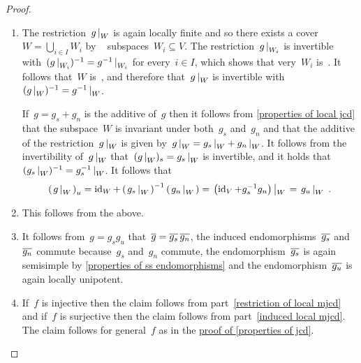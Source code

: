 \begin{proof}
  \leavevmode
  \begin{enumerate}[start=2]
    \item
      The restriction~$\restrict{g}{W}$ is again locally finite and so there exists a cover~$W = \bigcup_{i \in I} W_i$ by ~ subspaces~$W_i \subseteq V$.
      The restriction~$\restrict{g}{W_i}$ is invertible with~$(\restrict{g}{W_i})^{-1} = \restrict{g^{-1}}{W_i}$ for every~$i \in I$, which shows that very~$W_i$ is~.
      It follows that~$W$ is~, and therefore that~$\restrict{g}{W}$ is invertible with~$(\restrict{g}{W})^{-1} = \restrict{g^{-1}}{W}$.
      
      If~$g = g_s + g_n$ is the additive {\JCD} of~$g$ then it follows from \cref{properties of local jcd} that the subspace~$W$ is invariant under both~$g_s$ and~$g_n$ and that the additive {\JCD} of the restriction~$\restrict{g}{W}$ is given by~$\restrict{g}{W} = \restrict{g_s}{W} + \restrict{g_n}{W}$.
      It follows from the invertibility of~$\restrict{g}{W}$ that~$(\restrict{g}{W})_s = \restrict{g_s}{W}$ is invertible, and it holds that~$(\restrict{g_s}{W})^{-1} = \restrict{g_s^{-1}}{W}$.
      It follows that
      \[
          \left( \restrict*{g}{W} \right)_u
        =   \id_W
          + \left( \restrict*{g_s}{W} \right)^{-1}
            \left( \restrict*{g_n}{W} \right)
        = \restrict*{ \left( \id_V + g_s^{-1} g_n \right) }{W}
        = \restrict*{ g_u }{W} \,.
      \]
    \addtocounter{enumi}{-2}
    \item
      This follows from the above.
    \addtocounter{enumi}{1}
    \item
      It follows from~$g = g_s g_u$ that~$\overline{g} = \overline{g_s} \, \overline{g_n}$, the induced endomorphisms~$\overline{g_s}$ and~$\overline{g_n}$ commute because~$g_s$ and~$g_n$ commute, the endomorphism~$\overline{g_s}$ is again semisimple by \cref{properties of ss endomorphisms} and the endomorphism~$\overline{g_u}$ is again locally unipotent.
    \item
      If~$f$ is injective then the claim follows from part~\ref*{restriction of local mjcd} and if~$f$ is surjective then the claim follows from part~\ref*{induced local mjcd}.
      The claim follows for general~$f$ as in the \hyperref[properties of jcd proof]{proof of \cref{properties of jcd}}.
    \qedhere
  \end{enumerate}
\end{proof}


